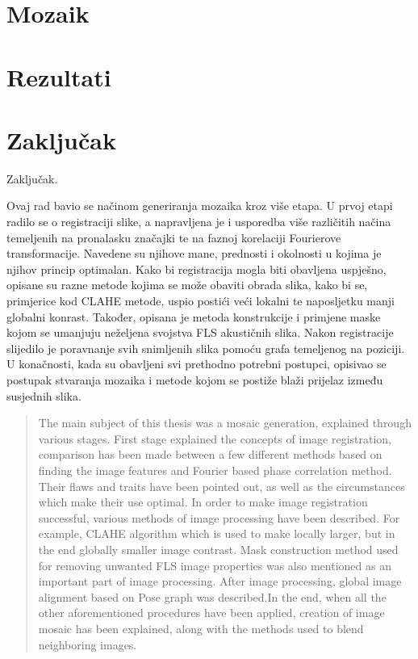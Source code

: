 \documentclass[times, utf8, diplomski]{fer}
\begin{document}
\chapter{Mozaik}

\chapter{Rezultati}
\chapter{Zaključak}
Zaključak.




\begin{sazetak}
Ovaj rad bavio se načinom generiranja mozaika kroz više etapa. U prvoj etapi radilo se o registraciji slike, a napravljena je i usporedba više različitih načina temeljenih na pronalasku značajki te na faznoj korelaciji Fourierove transformacije. Navedene su njihove mane, prednosti i okolnosti u kojima je njihov princip optimalan. Kako bi registracija mogla biti obavljena uspješno, opisane su razne metode kojima se može obaviti obrada slika, kako bi se, primjerice kod CLAHE metode, uspio postići veći lokalni te naposljetku manji globalni konrast. Također, opisana je metoda konstrukcije i primjene maske kojom se umanjuju neželjena svojstva FLS akustičnih slika. Nakon registracije slijedilo je poravnanje svih snimljenih slika pomoću grafa temeljenog na poziciji. U konačnosti, kada su obavljeni svi prethodno potrebni postupci, opisivao se postupak stvaranja mozaika i metode kojom se postiže blaži prijelaz između susjednih slika.

\end{sazetak}

\newpage
{}
\begin{abstract}
The main subject of this thesis was a mosaic generation, explained through various stages. First stage explained the concepts of image registration, comparison has been made between a few different methods based on finding the image features and Fourier based phase correlation method. Their flaws and traits have been pointed out, as well as the circumstances which make their use optimal. In order to make image registration successful, various methods of image processing have been described. For example, CLAHE algorithm which is used to make locally larger, but in the end globally smaller image contrast. Mask construction method used for removing unwanted FLS image properties was also mentioned as an important part of image processing. After image processing, global image alignment based on Pose graph was described.In the end, when all the other aforementioned procedures have been applied, creation of  image mosaic has been explained, along with the methods used to blend neighboring images.



\end{abstract}
\end{document}
